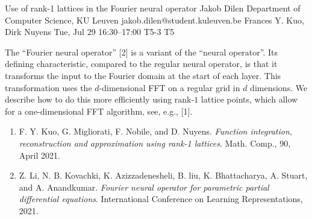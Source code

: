 \documentclass[12pt,lettersize,oneside]{book} %
\begin{document}
\begin{talk}
\end{talk}

\begin{talk}
  {Use of rank-1 lattices in the Fourier neural operator}%
  {Jakob Dilen}%
  {Department of Computer Science, KU Leuven}%
  {jakob.dilen@student.kuleuven.be}%
  {Frances Y. Kuo, Dirk Nuyens}%
  {}%
  {Tue, Jul 29 16:30--17:00}%
  {T5-3}%
  {T5}%
  
    

The ``Fourier neural operator'' [2] is a variant of the ``neural operator''.
Its defining characteristic, compared to the regular neural operator, is that it transforms the input to the Fourier domain at the start of each layer. This transformation uses the $d$-dimensional FFT on a regular grid in $d$ dimensions. We describe how to do this more efficiently using rank-$1$ lattice points, which allow for a one-dimensional FFT algorithm, see, e.g., [1]. 

\medskip
\begin{enumerate}
        \item[{[1]}] F. Y. Kuo, G. Migliorati, F. Nobile, and D. Nuyens. \textit{Function integration,
reconstruction and approximation using rank-1 lattices}. Math. Comp., 90, April
2021.   
        \item[{[2]}] Z. Li, N. B. Kovachki, K. Azizzadenesheli, B. liu, K. Bhattacharya, A. Stuart,
and A. Anandkumar. \textit{Fourier neural operator for parametric partial differential
equations}. International Conference on Learning Representations, 2021.
\end{enumerate}
\end{talk}
\end{document}
